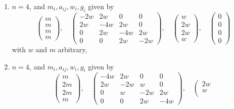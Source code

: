 \begin{lemma}
\begin{enumerate}
$$\begin{matrix}
2w \\
2w \\
4w
\end{matrix}
\right),
\quad
\left(
\begin{matrix}
0 \\
0 \\
0 \\
0
\end{matrix}
\right)
$$
with $w$ and $m$ arbitrary,
\item
\label{item-up-equal-down}
$n = 4$, and $m_i, a_{ij}, w_i, g_i$ given by
$$
\left(
\begin{matrix}
m \\
m \\
m \\
m
\end{matrix}
\right),
\quad
\left(
\begin{matrix}
-2w & 2w & 0 & 0 \\
2w & -4w & 2w & 0 \\
0 & 2w & -4w & 2w \\
0 & 0 & 2w & -2w
\end{matrix}
\right),
\quad
\left(
\begin{matrix}
w \\
2w \\
2w \\
w
\end{matrix}
\right),
\quad
\left(
\begin{matrix}
0 \\
0 \\
0 \\
0
\end{matrix}
\right)
$$
with $w$ and $m$ arbitrary,
\item
\label{item-down-equal-up}
$n = 4$, and $m_i, a_{ij}, w_i, g_i$ given by
$$
\left(
\begin{matrix}
m \\
2m \\
2m \\
m
\end{matrix}
\right),
\quad
\left(
\begin{matrix}
-4w & 2w & 0 & 0 \\
2w & -2w & w & 0 \\
0 & w & -2w & 2w \\
0 & 0 & 2w & -4w
\end{matrix}
\right),
\quad
\left(
\begin{matrix}
2w \\
w \\

\end{matrix}$$
\end{enumerate}
\end{lemma}
